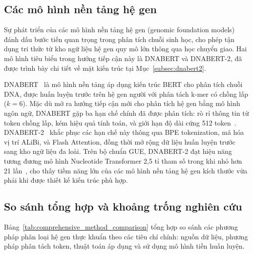 \subsection{Các mô hình nền tảng hệ gen}
\label{subsec:foundation_models}

Sự phát triển của các mô hình nền tảng hệ gen (genomic foundation models) đánh dấu bước tiến quan trọng trong phân tích chuỗi sinh học, cho phép tận dụng tri thức từ kho ngữ liệu hệ gen quy mô lớn thông qua học chuyển giao. Hai mô hình tiêu biểu trong hướng tiếp cận này là DNABERT và DNABERT-2, đã được trình bày chi tiết về mặt kiến trúc tại Mục~\ref{subsec:dnabert2}.

DNABERT~\cite{ji2021dnabert} là mô hình nền tảng áp dụng kiến trúc BERT cho phân tích chuỗi DNA, được huấn luyện trước trên hệ gen người với phân tách k-mer có chồng lấp ($k=6$). Mặc dù mở ra hướng tiếp cận mới cho phân tích hệ gen bằng mô hình ngôn ngữ, DNABERT gặp ba hạn chế chính đã được phân tích: rò rỉ thông tin từ token chồng lấp, kém hiệu quả tính toán, và giới hạn độ dài cứng 512 token~\cite{zhou2023dnabert}. DNABERT-2~\cite{zhou2023dnabert} khắc phục các hạn chế này thông qua BPE tokenization, mã hóa vị trí ALiBi, và Flash Attention, đồng thời mở rộng dữ liệu huấn luyện trước sang kho ngữ liệu đa loài. Trên bộ chuẩn GUE, DNABERT-2 đạt hiệu năng tương đương mô hình Nucleotide Transformer 2,5 tỉ tham số trong khi nhỏ hơn 21 lần~\cite{dalla2025nucleotide}, cho thấy tiềm năng lớn của các mô hình nền tảng hệ gen kích thước vừa phải khi được thiết kế kiến trúc phù hợp.

\subsection{So sánh tổng hợp và khoảng trống nghiên cứu}
\label{subsec:comparison_gaps}

Bảng~\ref{tab:comprehensive_method_comparison} tổng hợp so sánh các phương pháp phân loại hệ gen thực khuẩn theo các tiêu chí chính: nguồn dữ liệu, phương pháp phân tách token, thuật toán áp dụng và sử dụng mô hình tiền huấn luyện.

